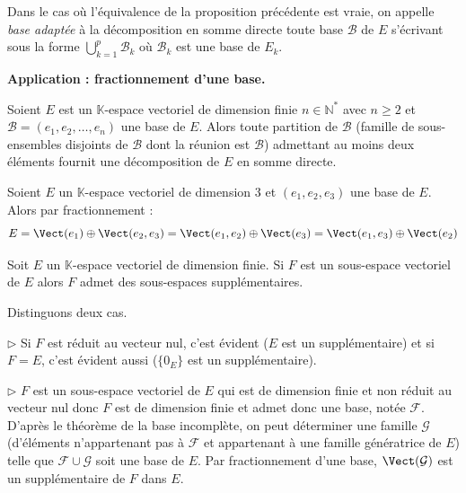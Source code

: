 \documentclass[french,11pt,twoside]{VcCours}
\begin{document}
\begin{Definition}{} Dans le cas où l'équivalence de la proposition précédente est vraie, on appelle \emph{base adaptée} à la décomposition en somme directe toute base $\mathcal{B}$ de $E$ s'écrivant sous la forme $\bigcup_{k=1}^p \mathcal{B}_k$ où $\mathcal{B}_k$ est une base de $E_k$.
\end{Definition}

\textbf{Application : fractionnement d'une base.}

Soient $E$ est un $\mathbb{K}$-espace vectoriel de dimension finie $n \in \mathbb{N}^*$ avec $n \geq 2$ et $\mathcal{B}=(e_1, e_2, \ldots, e_n)$ une base de $E$. Alors toute partition de $\mathcal{B}$ (famille de sous-ensembles disjoints de $\mathcal{B}$ dont la réunion est $\mathcal{B}$) admettant au moins deux éléments fournit une décomposition de $E$ en somme directe.

\medskip

\begin{Exemple} Soient $E$ un $\mathbb{K}$-espace vectoriel de dimension $3$ et $(e_1,e_2,e_3)$ une base de $E$. Alors par fractionnement :
$$ E = \Vect(e_1) \oplus \Vect(e_2,e_3) = \Vect(e_1,e_2) \oplus \Vect(e_3) = \Vect(e_1,e_3) \oplus \Vect(e_2) $$
\end{Exemple}

\medskip

\begin{Corollaire}{} Soit $E$ un $\mathbb{K}$-espace vectoriel de dimension finie. Si $F$ est un sous-espace vectoriel de $E$ alors $F$ admet des sous-espaces supplémentaires.
\end{Corollaire}

\begin{Demonstration}{} Distinguons deux cas.

$\rhd$ Si $F$ est réduit au vecteur nul, c'est évident ($E$ est un supplémentaire) et si $F=E$, c'est évident aussi ($\lbrace 0_E\rbrace$ est un supplémentaire).

\medskip

$\rhd$ $F$ est un sous-espace vectoriel de $E$ qui est de dimension finie et non réduit au vecteur nul donc $F$ est de dimension finie et admet donc une base, notée $\mathcal{F}$. D'après le théorème de la base incomplète, on peut déterminer une famille $\mathcal{G}$ (d'éléments n'appartenant pas à $\mathcal{F}$ et appartenant à une famille génératrice de $E$) telle que $\mathcal{F} \cup \mathcal{G}$ soit une base de $E$. Par fractionnement d'une base, $\Vect(\mathcal{G})$ est un supplémentaire de $F$ dans $E$.
\end{Demonstration}
\end{document}
